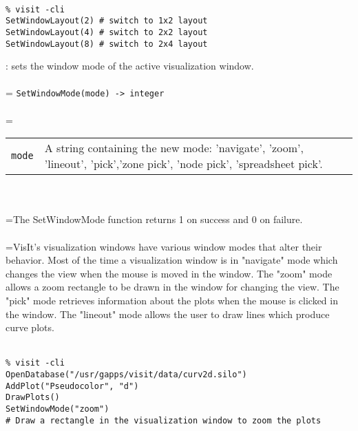 \documentclass[10pt,a4paper]{report}
\begin{document}
\\[-6mm]
\begin{verbatim}% visit -cli
SetWindowLayout(2) # switch to 1x2 layout
SetWindowLayout(4) # switch to 2x2 layout
SetWindowLayout(8) # switch to 2x4 layout
\end{verbatim}
\newpage


{}
: sets the window mode of the active visualization window.\\[-3mm]

 \\ 
\hangindent=\parindent 
\verb!SetWindowMode(mode) -> integer!\\ [-3mm]

 \\ 
\hangindent=\parindent 
\begin{tabular}{lp{9cm}}
\verb!mode! & A string containing the new mode: 'navigate', 'zoom', 'lineout', 'pick','zone pick', 'node pick', 'spreadsheet pick'. \\
\end{tabular} \\[-2mm]


 \\ 
\hangindent=\parindent The SetWindowMode function returns 1 on success and 0 on failure. \\[-3mm] 

 \\ 
\hangindent=\parindent VisIt's visualization windows have various window modes that alter their behavior. Most of the time a visualization window is in "navigate" mode which changes the view when the mouse is moved in the window. The "zoom" mode allows a zoom rectangle to be drawn in the window for changing the view. The "pick" mode retrieves information about the plots when the mouse is clicked in the window. The "lineout" mode allows the user to draw lines which produce curve plots. \\[-3mm] 

\\[-6mm]
\begin{verbatim}% visit -cli
OpenDatabase("/usr/gapps/visit/data/curv2d.silo")
AddPlot("Pseudocolor", "d")
DrawPlots()
SetWindowMode("zoom")
# Draw a rectangle in the visualization window to zoom the plots
\end{verbatim}
\newpage
\end{document}

